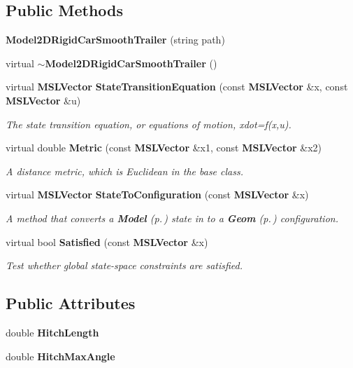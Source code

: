 \subsection*{Public Methods}
\begin{CompactItemize}
\item 
{\bf Model2DRigid\-Car\-Smooth\-Trailer} (string path)
\item 
virtual {\bf $\sim$Model2DRigid\-Car\-Smooth\-Trailer} ()
\item 
virtual {\bf MSLVector} {\bf State\-Transition\-Equation} (const {\bf MSLVector} \&x, const {\bf MSLVector} \&u)
\begin{CompactList}\small\item\em The state transition equation, or equations of motion, xdot=f(x,u).\item\end{CompactList}\item 
virtual double {\bf Metric} (const {\bf MSLVector} \&x1, const {\bf MSLVector} \&x2)
\begin{CompactList}\small\item\em A distance metric, which is Euclidean in the base class.\item\end{CompactList}\item 
virtual {\bf MSLVector} {\bf State\-To\-Configuration} (const {\bf MSLVector} \&x)
\begin{CompactList}\small\item\em A method that converts a {\bf Model} {\rm (p.\,\pageref{class_Model})} state in to a {\bf Geom} {\rm (p.\,\pageref{class_Geom})} configuration.\item\end{CompactList}\item 
virtual bool {\bf Satisfied} (const {\bf MSLVector} \&x)
\begin{CompactList}\small\item\em Test whether global state-space constraints are satisfied.\item\end{CompactList}\end{CompactItemize}
\subsection*{Public Attributes}
\begin{CompactItemize}
\item 
double {\bf Hitch\-Length}
\item 
double {\bf Hitch\-Max\-Angle}
\end{CompactItemize}


